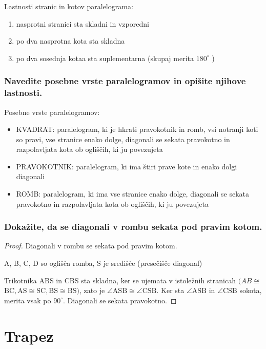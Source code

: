 \documentclass{article}
\begin{document}
Lastnosti stranic in kotov paralelograma:

\begin{enumerate}
    \item nasprotni stranici sta skladni in vzporedni
    \item po dva nasprotna kota sta skladna
    \item po dva sosednja kotaa sta suplementarna (skupaj merita $180^{\circ}$ )
\end{enumerate}

\subsubsection*{Navedite posebne vrste paralelogramov in opišite njihove lastnosti.}

Posebne vrste paralelogramov:
\begin{itemize}
    \item KVADRAT: paralelogram, ki je hkrati pravokotnik in romb, vsi notranji koti so pravi, vse stranice enako dolge, diagonali se sekata pravokotno in razpolavljata kota ob ogliščih, ki ju povezujeta
    \item PRAVOKOTNIK: paralelogram, ki ima štiri prave kote in enako dolgi diagonali
    \item ROMB: paralelogram, ki ima vse stranice enako dolge, diagonali se sekata pravokotno in razpolavljata kota ob ogliščih, ki ju povezujeta
\end{itemize}

\subsubsection*{Dokažite, da se diagonali v rombu sekata pod pravim kotom.}

\begin{proof}
     Diagonali v rombu se sekata pod pravim kotom.

     A, B, C, D so oglišča romba, S je središče (presečišče diagonal)

     Trikotnika ABS in CBS sta skladna, ker se ujemata v istoležnih stranicah $(A B \cong$ $\mathrm{BC}, \mathrm{AS} \cong \mathrm{SC}, \mathrm{BS} \cong \mathrm{BS})$, zato je $\angle \mathrm{ASB} \cong \angle \mathrm{CSB}$. Ker sta $\angle \mathrm{ASB}$ in $\angle \mathrm{CSB}$ sokota, merita vsak po $90^{\circ}$. Diagonali se sekata pravokotno.
\end{proof}
 

\section{Trapez}
\end{document}
